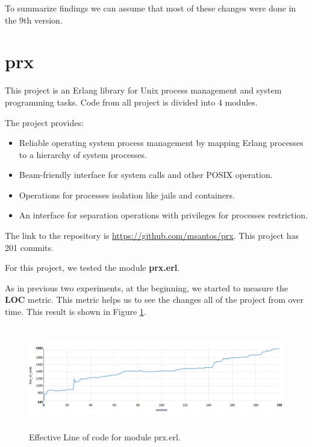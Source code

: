 To summarize findings we can assume that most of these changes were done in the 9th version.


\section{prx}

This project is an Erlang library for Unix process management and system programming tasks. Code from all project is divided into 4 modules. 

The project provides:

\begin{itemize}
	\item Reliable operating system process management by mapping Erlang processes to a hierarchy of system processes.
	\item Beam-friendly interface for system calls and other POSIX operation.
	\item Operations for processes isolation like jails and containers.
	\item An interface for separation operations with privileges for processes restriction.
\end{itemize}


The link to the repository is \url{https://github.com/msantos/prx}. This project has 201 commits. 

For this project, we tested the module \textbf{prx.erl}. 

As in previous two experiments, at the beginning, we started to measure the \textbf{LOC} metric. This metric helps us to see the changes all of the project from over time. This result is shown in Figure \ref{fig:line_of_code_prx}.

\begin{figure}[h]
	\centering
	\includegraphics[height=45mm]{figures/line_of_code_prx.png}
	\caption{Effective Line of code for module prx.erl.}
	\label{fig:line_of_code_prx}
\end{figure}


